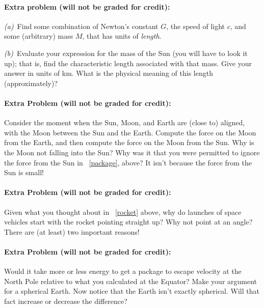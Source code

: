 \documentclass[12pt]{article}
\begin{document}
\paragraph{Extra problem (will not be graded for credit):}%
\textsl{(a)}~Find some combination of Newton's constant $G$, the speed of light $c$, and
some (arbitrary) mass $M$, that has units of \emph{length}.

\textsl{(b)}~Evaluate your expression for the mass of the Sun (you
will have to look it up); that is, find the characteristic length
associated with that mass.  Give your answer in units of km.  What is
the physical meaning of this length (approximately)?

\paragraph{Extra Problem (will not be graded for credit):}%
Consider the moment when the Sun, Moon, and Earth are (close to)
aligned, with the Moon between the Sun and the Earth. Compute the
force on the Moon from the Earth, and then compute the force on the
Moon from the Sun. Why is the Moon not falling into the Sun? Why was
it that you were permitted to ignore the force from the
Sun in \problemname~\ref{package}, above? It isn't because the force
from the Sun is small!

\paragraph{Extra Problem (will not be graded for credit):}%
Given what you thought about in \problemname~\ref{rocket} above, why do launches
of space vehicles start with the rocket pointing straight up? Why not
point at an angle? There are (at least) two important reasons!

\paragraph{Extra Problem (will not be graded for credit):}%
Would it take more or less energy to get a package to escape velocity
at the North Pole relative to what you calculated at the Equator? Make
your argument for a spherical Earth. Now notice that the Earth isn't
exactly spherical. Will that fact increase or decrease the difference?
\end{document}
